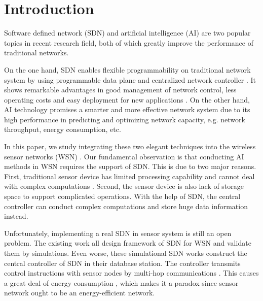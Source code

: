 \section{Introduction}




 
Software defined network (SDN) \cite{Benzekki2016Software,Sezer2013Are} and artificial intelligence (AI) 
\cite{Norvig1995Artificial, Poole2010Artificial, Cockburn1996ARCHON}
are two popular topics in recent research field, 
both of which greatly improve the performance of traditional
networks.
 
On the one hand, SDN enables flexible 
programmability on traditional network system 
by using programmable data plane and centralized network controller \cite{7122247}.
It shows remarkable advantages in good management of network control, 
less operating costs and easy deployment for new applications \cite{Feamster2014The}.
On the other hand, AI technology promises a smarter and more effective network system
due to its high performance in predicting and optimizing network capacity,
e.g. network throughput, energy consumption, etc.

In this paper, we study integrating these two elegant techniques into 
the wireless sensor networks (WSN) \cite{Dargie2010Fundamentals,Sohraby2007Wireless}. Our fundamental observation is 
that conducting AI methods in WSN requires
the support of SDN. This is due to two major reasons. 
First, traditional sensor device 
has limited processing capability and cannot deal with complex computations \cite{Sharma2012Security,Heller2012The}.
Second, the sensor device is also lack of storage space 
to support complicated operations. With the help of SDN, 
the central controller can conduct complex computations 
and store huge data information instead.
  
Unfortunately, implementing a real SDN in sensor system 
is still an open problem. The existing work 
 \cite{mahmud2011exploitation, costanzo2012software, luo2012sensor, de2015tinysdn, galluccio2015sdn} 
all design framework of SDN for WSN and validate them by simulations.  
Even worse, these simulational SDN works construct the central controller 
of SDN in their database station. The controller transmits control 
instructions with sensor nodes by multi-hop communications \cite{Mizuyama2017Estimation}.
This causes a great deal of energy consumption \cite{Yang2014}, which 
makes it a paradox since sensor network ought to be an energy-efficient network.

